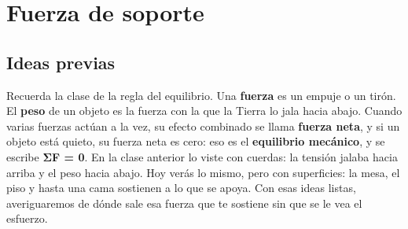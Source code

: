 \documentclass[
  spanish,
  letterpaper,
  12pt,
  oneside,
  open=any,
  DIV=15]{scrbook}
\newcommand{\setcolorsection}[2]{%
  \definecolor{currentsectionbg}{HTML}{#1}%
  \definecolor{currentsectionborder}{HTML}{#2}%
}
\begin{document}
\chapter{Fuerza de soporte}\label{fuerza-de-soporte}

\setcolorsection{f9ebaf}{e8d68a}

\section{Ideas previas}\label{ideas-previas-4}

\begin{tcolorbox}[enhanced jigsaw, arc=.35mm, bottomrule=.15mm, bottomtitle=1mm, breakable, colback=white, colbacktitle=quarto-callout-important-color!10!white, colframe=quarto-callout-important-color-frame, coltitle=black, left=2mm, leftrule=.75mm, opacityback=0, opacitybacktitle=0.6, rightrule=.15mm, title=\textcolor{quarto-callout-important-color}{\faExclamation}\hspace{0.5em}{Anclaje Cognitivo (Prerrequisitos)}, titlerule=0mm, toprule=.15mm, toptitle=1mm]

Recuerda la clase de la regla del equilibrio. Una \textbf{fuerza} es un
empuje o un tirón. El \textbf{peso} de un objeto es la fuerza con la que
la Tierra lo jala hacia abajo. Cuando varias fuerzas actúan a la vez, su
efecto combinado se llama \textbf{fuerza neta}, y si un objeto está
quieto, su fuerza neta es cero: eso es el \textbf{equilibrio mecánico},
y se escribe \textbf{ΣF = 0}. En la clase anterior lo viste con cuerdas:
la tensión jalaba hacia arriba y el peso hacia abajo. Hoy verás lo
mismo, pero con superficies: la mesa, el piso y hasta una cama sostienen
a lo que se apoya. Con esas ideas listas, averiguaremos de dónde sale
esa fuerza que te sostiene sin que se le vea el esfuerzo.

\end{tcolorbox}
\end{document}
